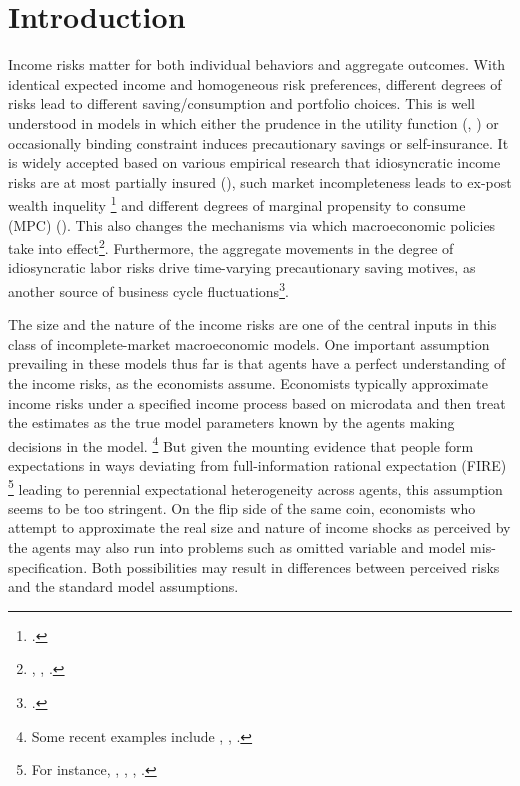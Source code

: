 
    \hypertarget{introduction}{%
\section{Introduction}\label{introduction}}

Income risks matter for both individual behaviors and aggregate
outcomes. With identical expected income and homogeneous risk
preferences, different degrees of risks lead to different
saving/consumption and portfolio choices. This is well understood in
models in which either the prudence in the utility function
(\cite{kimball1990precautionary}, \cite{carroll2001liquidity}) or occasionally binding constraint induces precautionary
savings or self-insurance. It is widely accepted based on various empirical research that
idiosyncratic income risks are at most partially insured
(\cite{blundell_consumption_2008}), such market incompleteness leads
to ex-post wealth inquelity \footnote{\cite{ aiyagari1994uninsured,huggett1996wealth,carroll1997nature,krusell1998income}.} and different degrees of marginal
propensity to consume (MPC) (\cite{krueger2016macroeconomics, carroll2017distribution}). This also changes the mechanisms via which macroeconomic policies take into effect\footnote{\cite{krueger2016macroeconomics}, \cite{kaplan2018monetary}, \cite{auclert2019monetary}.}. Furthermore, the aggregate movements in the degree of idiosyncratic labor risks drive time-varying precautionary saving motives, as another source of business cycle fluctuations\footnote{ \cite{challe2016precautionary, mckay2017time, kaplan2018microeconomic,den2018unemployment,bayer2019precautionary, acharya2020understanding,ravn2021macroeconomic}.}.

The size and the nature of the income risks are one of the central inputs in this class of incomplete-market macroeconomic models. One important assumption prevailing in these models thus far is that agents have a perfect understanding of the
income risks, as the economists assume. Economists typically approximate income risks under a specified income process based on microdata and then treat the estimates
as the true model parameters known by the agents making decisions in the
model. \footnote{Some recent examples include \cite{krueger2016macroeconomics}, \cite{bayer2019precautionary}, \cite{kaplan2018monetary}.}
 But given the mounting evidence that people form expectations in ways
deviating from full-information rational expectation (FIRE) \footnote{For instance, \cite{mankiw2003disagreement}, \cite{reis2006inattentive}, \cite{coibion2012can}, \cite{wang2021infvar}.} leading to perennial
expectational heterogeneity across agents, this
assumption seems to be too stringent. On the flip side of the same coin, economists who attempt to approximate the real size and nature of income shocks as perceived by the agents may also run into problems such as omitted variable and model mis-specification. Both possibilities may result in differences between perceived risks and the standard model assumptions. 

